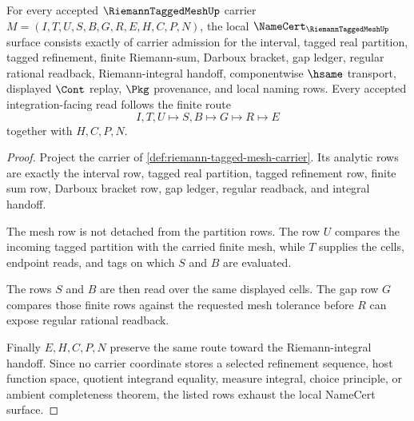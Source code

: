\begin{theorem}
\label{thm:riemann-tagged-mesh-namecert-obligations}
For every accepted $\RiemannTaggedMeshUp$ carrier $M=(I,T,U,S,B,G,R,E,H,C,P,N)$, the local $\NameCert_{\RiemannTaggedMeshUp}$ surface consists exactly of carrier admission for the interval, tagged real partition, tagged refinement, finite Riemann-sum, Darboux bracket, gap ledger, regular rational readback, Riemann-integral handoff, componentwise $\hsame$ transport, displayed $\Cont$ replay, $\Pkg$ provenance, and local naming rows. Every accepted integration-facing read follows the finite route
$$
I,T,U \longmapsto S,B \longmapsto G \longmapsto R \longmapsto E
$$
together with $H,C,P,N$.
\end{theorem}
\begin{proof}
Project the carrier of \autoref{def:riemann-tagged-mesh-carrier}. Its analytic rows are exactly the interval row, tagged real partition, tagged refinement row, finite sum row, Darboux bracket row, gap ledger, regular readback, and integral handoff.

The mesh row is not detached from the partition rows. The row $U$ compares the incoming tagged partition with the carried finite mesh, while $T$ supplies the cells, endpoint reads, and tags on which $S$ and $B$ are evaluated.

The rows $S$ and $B$ are then read over the same displayed cells. The gap row $G$ compares those finite rows against the requested mesh tolerance before $R$ can expose regular rational readback.

Finally $E,H,C,P,N$ preserve the same route toward the Riemann-integral handoff. Since no carrier coordinate stores a selected refinement sequence, host function space, quotient integrand equality, measure integral, choice principle, or ambient completeness theorem, the listed rows exhaust the local NameCert surface.
\end{proof}

